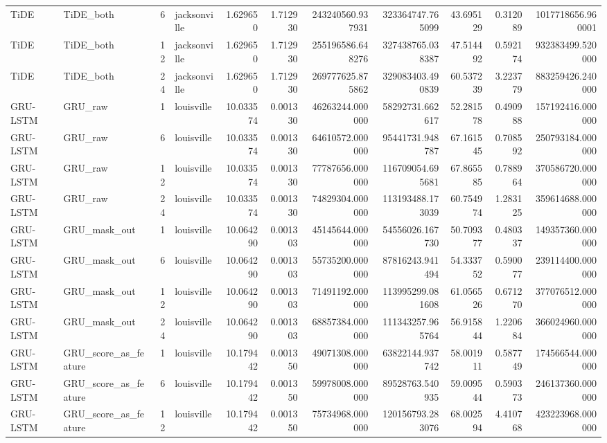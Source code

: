 \begin{longtable}{llrlrrrrrrr}
TiDE & TiDE\_both & 6 & jacksonville & 1.629650 & 1.712930 & 243240560.937931 & 323364747.765099 & 43.695129 & 0.312089 & 1017718656.960001 \\
TiDE & TiDE\_both & 12 & jacksonville & 1.629650 & 1.712930 & 255196586.648276 & 327438765.038387 & 47.514492 & 0.592174 & 932383499.520000 \\
TiDE & TiDE\_both & 24 & jacksonville & 1.629650 & 1.712930 & 269777625.875862 & 329083403.490839 & 60.537239 & 3.223779 & 883259426.240000 \\
GRU-LSTM & GRU\_raw & 1 & louisville & 10.033574 & 0.001330 & 46263244.000000 & 58292731.662617 & 52.281578 & 0.490988 & 157192416.000000 \\
GRU-LSTM & GRU\_raw & 6 & louisville & 10.033574 & 0.001330 & 64610572.000000 & 95441731.948787 & 67.161545 & 0.708592 & 250793184.000000 \\
GRU-LSTM & GRU\_raw & 12 & louisville & 10.033574 & 0.001330 & 77787656.000000 & 116709054.695681 & 67.865585 & 0.788964 & 370586720.000000 \\
GRU-LSTM & GRU\_raw & 24 & louisville & 10.033574 & 0.001330 & 74829304.000000 & 113193488.173039 & 60.754974 & 1.283125 & 359614688.000000 \\
GRU-LSTM & GRU\_mask\_out & 1 & louisville & 10.064290 & 0.001303 & 45145644.000000 & 54556026.167730 & 50.709377 & 0.480337 & 149357360.000000 \\
GRU-LSTM & GRU\_mask\_out & 6 & louisville & 10.064290 & 0.001303 & 55735200.000000 & 87816243.941494 & 54.333752 & 0.590077 & 239114400.000000 \\
GRU-LSTM & GRU\_mask\_out & 12 & louisville & 10.064290 & 0.001303 & 71491192.000000 & 113995299.081608 & 61.056526 & 0.671270 & 377076512.000000 \\
GRU-LSTM & GRU\_mask\_out & 24 & louisville & 10.064290 & 0.001303 & 68857384.000000 & 111343257.965764 & 56.915844 & 1.220684 & 366024960.000000 \\
GRU-LSTM & GRU\_score\_as\_feature & 1 & louisville & 10.179442 & 0.001350 & 49071308.000000 & 63822144.937742 & 58.001911 & 0.587749 & 174566544.000000 \\
GRU-LSTM & GRU\_score\_as\_feature & 6 & louisville & 10.179442 & 0.001350 & 59978008.000000 & 89528763.540935 & 59.009544 & 0.590373 & 246137360.000000 \\
GRU-LSTM & GRU\_score\_as\_feature & 12 & louisville & 10.179442 & 0.001350 & 75734968.000000 & 120156793.283076 & 68.002594 & 4.410768 & 423223968.000000 \\

\end{longtable}
